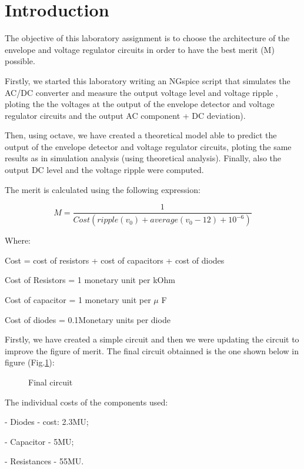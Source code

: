\section{Introduction}
\label{sec:introduction}

The objective of this laboratory assignment is to choose the architecture of the envelope and voltage regulator circuits in order to have the best merit (M) possible. \par
Firstly, we started this laboratory writing an NGspice script that simulates the AC/DC converter and measure the output voltage level and voltage ripple , ploting the the voltages at the output of the envelope detector and voltage regulator circuits and the output AC component + DC deviation).\par
Then, using octave, we have created a theoretical model able to predict the output of the envelope detector and voltage regulator circuits, ploting the same results as in simulation analysis (using theoretical analysis). Finally, also the output DC level and the voltage ripple were computed. \par

The merit is calculated using the following expression:\par
\begin{equation}
    M = \frac{1}{Cost(ripple(v_0)+average(v_0-12)+10^{-6})}
\end{equation}\par
Where: \par
Cost = cost of resistors + cost of capacitors + cost of diodes \par
Cost of Resistors = 1 monetary unit per kOhm \par
Cost of capacitor = 1 monetary unit per $\mu$ F \par
Cost of diodes = 0.1Monetary units per diode \par
Firstly, we have created a simple circuit and then we were updating the circuit to improve the figure of merit. The final circuit obtainned is the one shown below in figure (Fig.\ref{fig:circuito}): \par

\begin{figure}[H]
\centering
\caption{Final circuit}
\label{fig:circuito}
\end{figure}

The individual costs of the components used: \par
- Diodes - cost: 2.3MU; \par
- Capacitor - 5MU; \par
- Resistances - 55MU. \par

